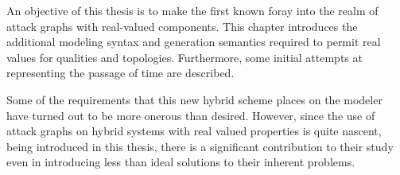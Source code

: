 An objective of this thesis is to make the first known foray into the realm of
attack graphs with real-valued components. This chapter introduces the additional
modeling syntax and generation semantics required to permit real values for
qualities and topologies. Furthermore, some initial attempts at representing
the passage of time are described. 

Some of the requirements that this new hybrid scheme places on the modeler
have turned out to be more onerous than desired. However, since the use of 
attack graphs on hybrid systems with real valued properties is quite nascent, 
being introduced in this thesis, there is a significant contribution to their
study even in introducing less than ideal solutions to their inherent problems.
